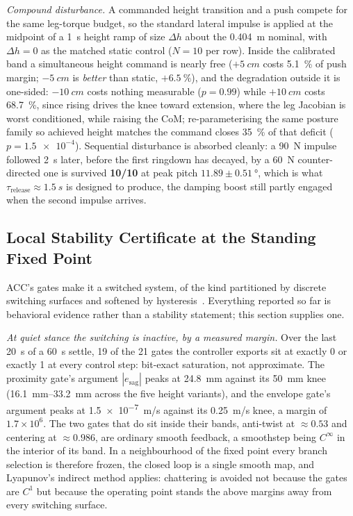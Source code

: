 \documentclass{jcd}
\begin{document}
\emph{Compound disturbance.} A commanded height transition and a push compete for
the same leg-torque budget, so the standard lateral impulse is applied at the
midpoint of a \SI{1}{s} height ramp of size $\Delta h$ about the \SI{0.404}{m}
nominal, with $\Delta h{=}0$ as the matched static control ($N{=}10$ per row).
Inside the calibrated band a simultaneous height command is nearly free
(${+}\SI{5}{cm}$ costs \SI{5.1}{\percent} of push margin; ${-}\SI{5}{cm}$ is
\emph{better} than static, $+\SI{6.5}{\percent}$), and the degradation outside it
is one-sided: ${-}\SI{10}{cm}$ costs nothing measurable ($p{=}0.99$) while
${+}\SI{10}{cm}$ costs \SI{68.7}{\percent}, since rising drives the knee toward extension, where the leg Jacobian is worst conditioned, while raising the CoM;
re-parameterising the same posture family so achieved height matches the command
closes \SI{35}{\percent} of that deficit ($p{=}\num{1.5e-4}$). Sequential
disturbance is absorbed cleanly: a \SI{90}{N} impulse followed \SI{2}{s} later,
before the first ringdown has decayed, by a \SI{60}{N} counter-directed one is
survived \textbf{10/10} at peak pitch $11.89{\pm}\SI{0.51}{\degree}$, which is what $\tau_{\text{release}}{\approx}\SI{1.5}{s}$ is designed to produce, the damping
boost still partly engaged when the second impulse arrives.


\subsection{Local Stability Certificate at the Standing Fixed Point}
\label{sec:stability}

ACC's gates make it a switched system, of the kind partitioned by discrete
switching surfaces and softened by
hysteresis~\citep{liberzon2003switching,hespanha2003hysteresis}. Everything
reported so far is behavioral evidence rather than a stability statement; this
section supplies one.

\emph{At quiet stance the switching is inactive, by a measured margin.} Over the
last \SI{20}{s} of a \SI{60}{s} settle, \num{19} of the \num{21} gates the
controller exports sit at exactly \num{0} or exactly \num{1} at every control
step: bit-exact saturation, not approximate. The proximity gate's argument
$|e_{\text{sag}}|$ peaks at \SI{24.8}{mm} against its \SI{50}{mm} knee
(\SIrange{16.1}{33.2}{mm} across the five height variants), and the envelope
gate's argument peaks at \SI{1.5e-7}{m/s} against its \SI{0.25}{m/s} knee, a
margin of $1.7{\times}10^{6}$. The two gates that do sit inside their bands, anti-twist at ${\approx}\num{0.53}$ and centering at ${\approx}\num{0.986}$, are ordinary smooth feedback, a smoothstep being
$C^\infty$ in the interior of its band. In a neighbourhood of the fixed point
every branch selection is therefore frozen, the closed loop is a single smooth
map, and Lyapunov's indirect method applies: chattering is avoided not because
the gates are $C^1$ but because the operating point stands the above margins
away from every switching surface.
\end{document}

